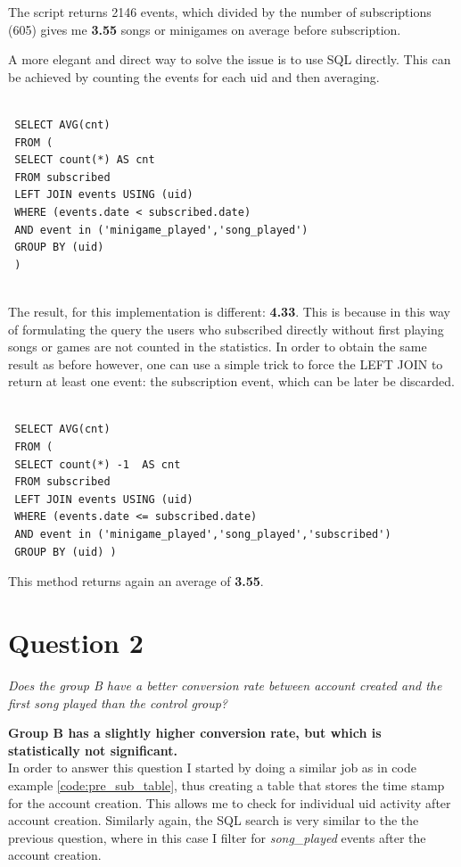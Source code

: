 \documentclass[paper=a4, fontsize=11pt]{report}
\begin{document}
The script returns 2146 events, which divided by the number of subscriptions (605) gives me
\textbf{3.55} songs or minigames on average before subscription.

A more elegant and direct way to solve the issue is to use SQL directly. This can be achieved by
counting the events for each uid and then averaging.

\begin{lstlisting}[frame=single,caption=Return SQL average \label{code:sql_average_table}]

 SELECT AVG(cnt)
 FROM (  
 SELECT count(*) AS cnt
 FROM subscribed 
 LEFT JOIN events USING (uid)
 WHERE (events.date < subscribed.date)
 AND event in ('minigame_played','song_played') 
 GROUP BY (uid)
 )
  
\end{lstlisting}

The result, for this implementation is different: \textbf{4.33}. This is because in this way of formulating the query the users who subscribed directly without first playing songs or games are not counted in the statistics. In order to obtain the same result as before however, one can use a simple trick to force the LEFT JOIN to return at least one event: the subscription event, which can be later be discarded.


\begin{lstlisting}[frame=single,caption=Return SQL average - Fixed \label{code:sql_average_fixed_table}]

 SELECT AVG(cnt)
 FROM ( 
 SELECT count(*) -1  AS cnt
 FROM subscribed 
 LEFT JOIN events USING (uid)
 WHERE (events.date <= subscribed.date)
 AND event in ('minigame_played','song_played','subscribed') 
 GROUP BY (uid) )
\end{lstlisting}

This method returns again an average of \textbf{3.55}.


\section*{Question 2}

\textit{Does the group B have a better conversion rate between account created and
the first song played than the control group?}

\textbf{Group B has a slightly higher conversion rate, but which is statistically not significant.}\\

In order to answer this question I started by doing a similar job as in code example \ref{code:pre_sub_table}, thus creating a table that stores the time stamp
for the account creation. This allows me to check for individual uid activity after account creation. Similarly again, the SQL search is very similar to the 
the previous question, where in this case I filter for \textit{song\_played} events after the account creation.
\end{document}

